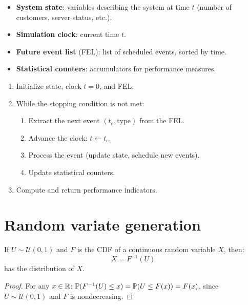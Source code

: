 \begin{definition}
\begin{itemize}
  \item \textbf{System state}: variables describing the system at time $t$
        (number of customers, server status, etc.).
  \item \textbf{Simulation clock}: current time $t$.
  \item \textbf{Future event list} (FEL): list of scheduled events, sorted
        by time.
  \item \textbf{Statistical counters}: accumulators for performance measures.
\end{itemize}
\end{definition}

\begin{algorithme}[title=\textbf{DES main loop}]
\begin{enumerate}
  \item Initialize state, clock $t = 0$, and FEL.
  \item While the stopping condition is not met:
    \begin{enumerate}
      \item Extract the next event $(t_e, \text{type})$ from the FEL.
      \item Advance the clock: $t \leftarrow t_e$.
      \item Process the event (update state, schedule new events).
      \item Update statistical counters.
    \end{enumerate}
  \item Compute and return performance indicators.
\end{enumerate}
\end{algorithme}

\section{Random variate generation}

\begin{theorem}
If $U \sim \mathcal{U}(0,1)$ and $F$ is the CDF of a continuous random
variable $X$, then:
\[
  X = F^{-1}(U)
\]
has the distribution of $X$.
\end{theorem}

\begin{proof}
For any $x \in \mathbb{R}$:
$\mathbb{P}(F^{-1}(U) \leq x) = \mathbb{P}(U \leq F(x)) = F(x)$,
since $U \sim \mathcal{U}(0,1)$ and $F$ is nondecreasing.
\end{proof}

